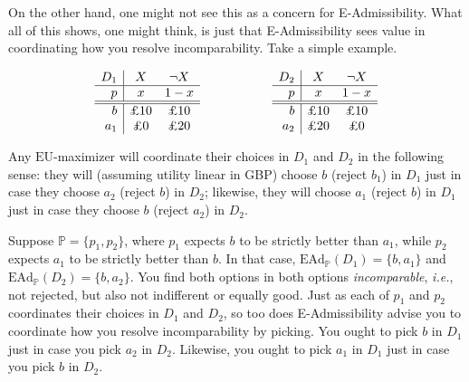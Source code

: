 \documentclass[a4paper]{article}
\renewcommand\P{\mathbb{P}} %
\newcommand\EU{\mathrm{EU}}
\newcommand\EAd{\mathrm{EAd}}
\newcommand{\IP}{\P}
\newenvironment{CCM rewritten}
{\begingroup\color{blue}} %
{\endgroup}              %
\begin{document}
{{	
	On the other hand, one might not see this as a concern for E-Admissibility. %
What all of this shows, one might think, is just that E-Admissibility sees value in coordinating how you resolve incomparability. Take a simple example.
	
	
	$$
	\begin{array}{r|cc}
		D_1 & X & \neg X  \\
		\hline
		p & x & 1-x \\
		\hline
		\hline
		b & \text{\pounds 10} & \text{\pounds 10}   \\
		a_1 & \text{\pounds 0} & \text{\pounds 20} 
	\end{array}\hspace{20mm}
	\begin{array}{r|cc}
		D_2 & X & \neg X  \\
		\hline
		p & x & 1-x \\
		\hline
		\hline
		b & \text{\pounds 10} & \text{\pounds 10}   \\
		a_2 & \text{\pounds 20} & \text{\pounds 0} 
	\end{array}
	$$
	
	Any $\EU$-maximizer will coordinate their choices in $D_1$ and $D_2$ in the following sense: they will (assuming utility linear in GBP) choose $b$ (reject $b_1$) in $D_1$ just in case they choose $a_2$ (reject $b$) in $D_2$; likewise, they will choose $a_1$ (reject $b$) in $D_1$ just in case they choose $b$ (reject $a_2$) in $D_2$. 
	
	Suppose $\IP = \{p_1, p_2\}$, where $p_1$ expects $b$ to be strictly better than $a_1$, while $p_2$ expects $a_1$ to be strictly better than $b$. In that case, $\EAd_\IP(D_1)=\{b,a_1\}$ and $\EAd_\IP(D_2)=\{b,a_2\}$. You find both options in both options \textit{incomparable}, \textit{i.e.}, not rejected, but also not indifferent or equally good. Just as each of $p_1$ and $p_2$ coordinates their choices in $D_1$ and $D_2$, so too does E-Admissibility advise you to coordinate how you resolve incomparability by picking. You ought to pick $b$ in $D_1$ just in case you pick $a_2$ in $D_2$. Likewise, you ought to pick $a_1$ in $D_1$ just in case you pick $b$ in $D_2$. 
	
}}
\end{document}
